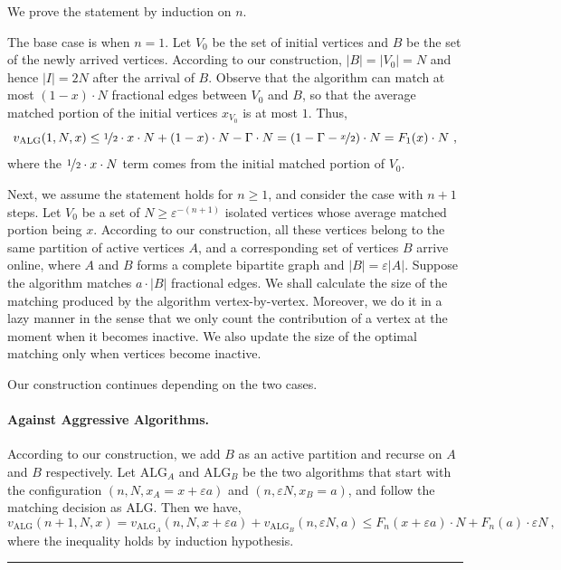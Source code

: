 \documentclass[11pt,letterpaper]{article}
\newenvironment{proof}{{\bf Proof:  }}{\hfill\rule{2mm}{2mm}\vspace*{5pt}}
\newcommand{\alg}{\mathrm{ALG}}
\newcommand{\eps}{\varepsilon}
\begin{document}
\begin{proof}
We prove the statement by induction on $n$.

The base case is when $n=1$. Let $V_0$ be the set of initial vertices and $B$ be the set of the newly arrived vertices. According to our construction, $|B|=|V_0|=N$ and hence $|I| = 2N$ after the arrival of $B$. Observe that the algorithm can match at most $(1 - x) \cdot N$ fractional edges between $V_0$ and $B$, so that the average matched portion of the initial vertices $x_{V_0}$ is at most $1$. Thus,
\[
v_\alg(1,N,x) \le \nicefrac{1}{2} \cdot x\cdot N + (1-x)\cdot N -\Gamma \cdot N = (1-\Gamma - \nicefrac{x}{2}) \cdot N = F_1(x) \cdot N~,
\]
where the $\nicefrac{1}{2}\cdot x \cdot N$ term comes from the initial matched portion of $V_0$.

Next, we assume the statement holds for $n\ge 1$, and consider the case with $n+1$ steps. 
Let $V_0$ be a set of $N \ge \eps^{-(n+1)}$ isolated vertices whose average matched portion being $x$.
According to our construction, all these vertices belong to the same partition of active vertices $A$, and a corresponding set of vertices $B$ arrive online, where $A$ and $B$ forms a complete bipartite graph and $|B|=\eps|A|$.
Suppose the algorithm matches $a \cdot |B|$ fractional edges. 
We shall calculate the size of the matching produced by the algorithm vertex-by-vertex. Moreover, we do it in a lazy manner in the sense that we only count the contribution of a vertex at the moment when it becomes inactive. We also update the size of the optimal matching only when vertices become inactive.

Our construction continues depending on the two cases.

\paragraph{Against Aggressive Algorithms.}
According to our construction, we add $B$ as an active partition and recurse on $A$ and $B$ respectively. 
Let $\alg_A$ and $\alg_B$ be the two algorithms that start with the configuration $(n,N,x_A=x+\eps a)$ and $(n,\eps N, x_B=a)$, and follow the matching decision as $\alg$. Then we have,
\begin{equation}
v_\alg(n+1,N,x)= v_{\alg_A}(n,N,x+\eps a) + v_{\alg_B}(n,\eps N, a) \le F_n(x+\eps a)\cdot N + F_n(a)\cdot \eps N~,
\label{eqn:aggressive}
\end{equation}
where the inequality holds by induction hypothesis.



\end{proof}
\end{document}
